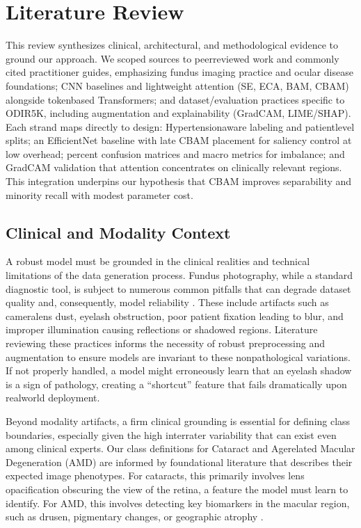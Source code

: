 \chapter{Literature Review}
This review synthesizes clinical, architectural, and methodological evidence to ground our approach. We scoped sources to peer\textendash reviewed work and commonly cited practitioner guides, emphasizing fundus imaging practice and ocular disease foundations; CNN baselines and lightweight attention (SE, ECA, BAM, CBAM) alongside token\textendash based Transformers; and dataset/evaluation practices specific to ODIR\textendash 5K, including augmentation and explainability (Grad\textendash CAM, LIME/SHAP). Each strand maps directly to design: Hypertension\textendash aware labeling and patient\textendash level splits; an EfficientNet baseline with late CBAM placement for saliency control at low overhead; percent confusion matrices and macro metrics for imbalance; and Grad\textendash CAM validation that attention concentrates on clinically relevant regions. This integration underpins our hypothesis that CBAM improves separability and minority recall with modest parameter cost.

\section{Clinical and Modality Context}
A robust model must be grounded in the clinical realities and technical limitations of the data generation process. Fundus photography, while a standard diagnostic tool, is subject to numerous common pitfalls that can degrade dataset quality and, consequently, model reliability \cite{docxRef01,docxRef04,docxRef05}. These include artifacts such as camera\textendash lens dust, eyelash obstruction, poor patient fixation leading to blur, and improper illumination causing reflections or shadowed regions. Literature reviewing these practices \cite{docxRef04,docxRef05} informs the necessity of robust preprocessing and augmentation to ensure models are invariant to these non\textendash pathological variations. If not properly handled, a model might erroneously learn that an eyelash shadow is a sign of pathology, creating a ``shortcut'' feature that fails dramatically upon real\textendash world deployment.

Beyond modality artifacts, a firm clinical grounding is essential for defining class boundaries, especially given the high inter\textendash rater variability that can exist even among clinical experts. Our class definitions for Cataract and Age\textendash related Macular Degeneration (AMD) are informed by foundational literature \cite{docxRef07,docxRef08,docxRef09,docxRef12,docxRef13} that describes their expected image phenotypes. For cataracts, this primarily involves lens opacification obscuring the view of the retina, a feature the model must learn to identify. For AMD, this involves detecting key biomarkers in the macular region, such as drusen, pigmentary changes, or geographic atrophy \cite{docxRef09,docxRef12}.

